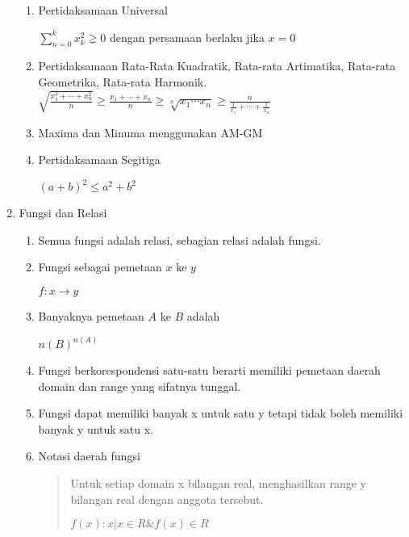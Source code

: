 \documentclass[12pt,a4paper,draft,final,oneside,twoside,openright,openany]{article}
\begin{document}
\begin{enumerate}
\begin{enumerate}
					\item Pertidaksamaan Universal
					\begin{center}
						$\sum_{n=0}^{k} x^2_k \gneq 0$ dengan persamaan berlaku jika $x=0$
					\end{center}
					\item Pertidaksamaan Rata-Rata Kuadratik, Rata-rata Artimatika, Rata-rata Geometrika, Rata-rata Harmonik.
					$\sqrt{\frac{x_1^2+\cdots+x_n^2}{n}} \ge\frac{x_1+\cdots+x_n}{n}\ge\sqrt[n]{x_1\cdots x_n}\ge\frac{n}{\frac{1}{x_1}+\cdots+\frac{1}{x_n}}$
					
					\item Maxima dan Minuma menggunakan AM-GM
					\item Pertidaksamaan Segitiga
					\begin{center}
						 $(a+b)^2\leq a^2+b^2$
					\end{center}
					
				\end{enumerate}
				
			\item Fungsi dan Relasi
				\begin{enumerate}
					\item Semua fungsi adalah relasi, sebagian relasi adalah fungsi.
					\item Fungsi sebagai pemetaan $x$ ke $y$
					\begin{center}
						$f:x\rightarrow y$
					\end{center}
							
					\item Banyaknya pemetaan $A$ ke $B$ adalah 
					\begin{center}
						$n(B)^{n(A)}$
					\end{center}
					
					\item Fungsi berkorespondensi satu-satu berarti memiliki pemetaan daerah domain dan range yang sifatnya tunggal.
					
					\item Fungsi dapat memiliki banyak x untuk satu y tetapi tidak boleh memiliki banyak y untuk satu x.
					
					\item Notasi daerah fungsi
					\begin{center}
						\begin{quote}
							Untuk setiap domain x bilangan real, menghasilkan range y bilangan real dengan anggota tersebut.
							\begin{center}
								$f(x):{x|x\in R \& f(x)\in R}$
							\end{center}
						\end{quote}
					\end{center}
					

\end{enumerate}
\end{enumerate}
\end{document}
